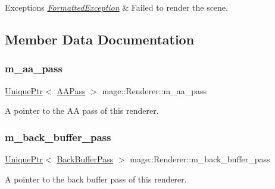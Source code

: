 \begin{DoxyExceptions}{Exceptions}
{\em \hyperlink{classmage_1_1_formatted_exception}{Formatted\+Exception}} & Failed to render the scene. \\
\hline
\end{DoxyExceptions}


\subsection{Member Data Documentation}
\hypertarget{classmage_1_1_renderer_a275986047921b355d94b1a7111df6665}{}\label{classmage_1_1_renderer_a275986047921b355d94b1a7111df6665} 
\subsubsection{\texorpdfstring{m\+\_\+aa\+\_\+pass}{m\_aa\_pass}}
{\footnotesize\ttfamily \hyperlink{namespacemage_a3316d7143a973e37adf1110f2e80ca31}{Unique\+Ptr}$<$ \hyperlink{classmage_1_1_a_a_pass}{A\+A\+Pass} $>$ mage\+::\+Renderer\+::m\+\_\+aa\+\_\+pass\hspace{0.3cm}{\ttfamily [private]}}

A pointer to the AA pass of this renderer. \hypertarget{classmage_1_1_renderer_a21db5f4d584b3325911d132d0022b856}{}\label{classmage_1_1_renderer_a21db5f4d584b3325911d132d0022b856} 
\subsubsection{\texorpdfstring{m\+\_\+back\+\_\+buffer\+\_\+pass}{m\_back\_buffer\_pass}}
{\footnotesize\ttfamily \hyperlink{namespacemage_a3316d7143a973e37adf1110f2e80ca31}{Unique\+Ptr}$<$ \hyperlink{classmage_1_1_back_buffer_pass}{Back\+Buffer\+Pass} $>$ mage\+::\+Renderer\+::m\+\_\+back\+\_\+buffer\+\_\+pass\hspace{0.3cm}{\ttfamily [private]}}

A pointer to the back buffer pass of this renderer. \hypertarget{classmage_1_1_renderer_a36271439a6217d1fd9b9162f5d90b738}{}\label{classmage_1_1_renderer_a36271439a6217d1fd9b9162f5d90b738} 
